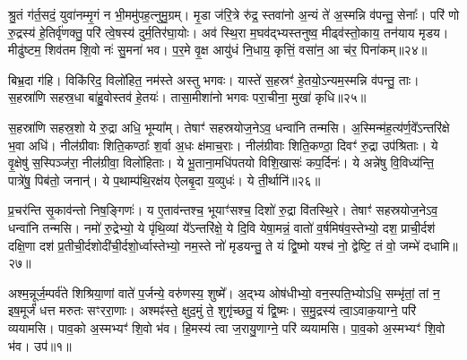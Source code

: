 श्रु॒तं ग॑र्त॒सदं॒ युवा॑नम्मृ॒गं न भी॒ममु॑पह॒त्नुमु॒ग्रम्। मृ॒डा ज॑रि॒त्रे रु॑द्र॒ स्तवा॑नो अ॒न्यं ते॑ अ॒स्मन्नि व॑पन्तु॒ सेनाः᳚। परि॑ णो रु॒द्रस्य॑ हे॒तिर्वृ॑णक्तु॒ परि॑ त्वे॒षस्य॑ दुर्म॒तिर॑घा॒योः। अव॑ स्थि॒रा म॒घव॑द्भ्यस्तनुष्व॒ मीढ्व॑स्तो॒काय॒ तन॑याय मृडय। मीढु॑ष्टम॒ शिव॑तम शि॒वो नः॑ सु॒मना॑ भव। प॒र॒मे वृ॒क्ष आयु॑धं नि॒धाय॒ कृत्तिं॒ वसा॑न॒ आ च॑र॒ पिना॑कम्॥२४॥

बिभ्र॒दा ग॑हि। विकि॑रिद॒ विलो॑हित॒ नम॑स्ते अस्तु भगवः। यास्ते॑ स॒हस्रꣳ॑ हे॒तयो॒\-ऽन्यम॒स्मन्नि व॑पन्तु॒ ताः। स॒हस्रा॑णि सहस्र॒धा बा॑हु॒वोस्तव॑ हे॒तयः॑। तासा॒मीशा॑नो भगवः परा॒चीना॒ मुखा॑ कृधि॥२५॥

{\anuvakamend[{अ॒स्मिꣴ स्त॒नुवः॑ स्तु॒हि पिना॑क॒मेका॒न्नत्रि॒ꣳ॒शच्च॑॥10॥}]}

स॒हस्रा॑णि सहस्र॒शो ये रु॒द्रा अधि॒ भूम्या᳚म्। तेषाꣳ॑ सहस्रयोज॒ने\-ऽव॒ धन्वा॑नि तन्मसि। अ॒स्मिन्म॑ह॒त्य॑र्ण॒वे᳚\-ऽ\-न्तरि॑क्षे भ॒वा अधि॑। नील॑ग्रीवाः शिति॒कण्ठाः᳚ श॒र्वा अ॒धः क्ष॑माच॒राः। नील॑ग्रीवाः शिति॒कण्ठा॒ दिवꣳ॑ रु॒द्रा उप॑श्रिताः। ये वृ॒क्षेषु॑ स॒स्पिञ्ज॑रा॒ नील॑ग्रीवा॒ विलो॑हिताः। ये भू॒ताना॒मधि॑पतयो विशि॒खासः॑ कप॒र्दिनः॑। ये अन्ने॑षु वि॒विध्य॑न्ति॒ पात्रे॑षु॒ पिब॑तो॒ जनान्॑। ये प॒थाम्प॑थि॒रक्ष॑य ऐलबृ॒दा य॒व्युधः॑। ये ती॒र्थानि॑॥२६॥

प्र॒चर॑न्ति सृ॒काव॑न्तो निष॒ङ्गिणः॑। य ए॒ताव॑न्तश्च॒ भूयाꣳ॑सश्च॒ दिशो॑ रु॒द्रा वि॑तस्थि॒रे। तेषाꣳ॑ सहस्रयोज॒ने\-ऽव॒ धन्वा॑नि तन्मसि। नमो॑ रु॒द्रेभ्यो॒ ये पृ॑थि॒व्यां ये᳚\-ऽन्तरि॑क्षे॒ ये दि॒वि येषा॒मन्नं॒ वातो॑ व॒र्\mbox{}षमिष॑व॒स्तेभ्यो॒ दश॒ प्राची॒र्दश॑ दक्षि॒णा दश॑ प्र॒तीची॒र्दशोदी॑ची॒र्दशो॒र्ध्वास्तेभ्यो॒ नम॒स्ते नो॑ मृडयन्तु॒ ते यं द्वि॒ष्मो यश्च॑ नो॒ द्वेष्टि॒ तं वो॒ जम्भे॑ दधामि॥२७॥


{\anuvakamend[{ती॒र्थानि॒ यश्च॒ षट्च॑॥11॥}]}

{}

{}

\setcounter{anuvakam}{0}
अश्म॒न्नूर्ज॒म्पर्व॑ते शिश्रिया॒णां वाते॑ प॒र्जन्ये॒ वरु॑णस्य॒ शुष्मे᳚। अ॒द्भ्य ओष॑धीभ्यो॒ वन॒स्पति॒भ्यो\-ऽधि॒ सम्भृ॑तां॒ तां न॒ इष॒मूर्जं॑ धत्त मरुतः सꣳररा॒णाः। अश्मꣴ॑स्ते॒ क्षुद॒मुं ते॒ शुगृ॑च्छतु॒ यं द्वि॒ष्मः। स॒मु॒द्रस्य॑ त्वा॒\-ऽवाक॒याग्ने॒ परि॑ व्ययामसि। पाव॒को अ॒स्मभ्यꣳ॑ शि॒वो भ॑व। हि॒मस्य॑ त्वा ज॒रायु॒णाग्ने॒ परि॑ व्ययामसि। पा॒व॒को अ॒स्मभ्यꣳ॑ शि॒वो भ॑व। उप॑॥१॥

